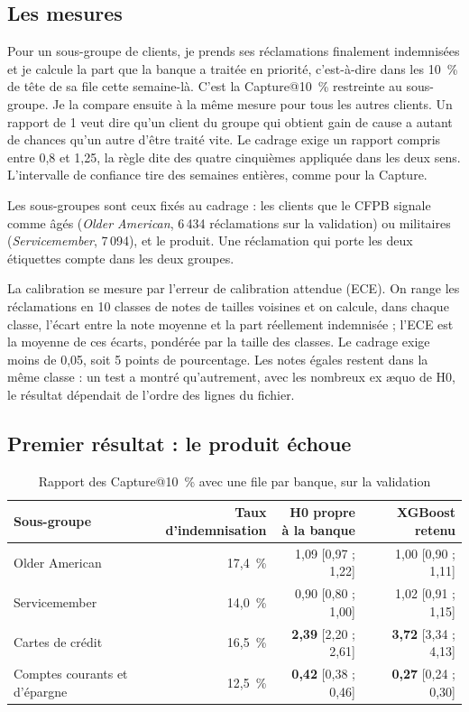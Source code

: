 \documentclass[11pt,a4paper]{article}
\begin{document}
\subsection{Les mesures}

Pour un sous-groupe de clients, je prends ses réclamations finalement indemnisées et je calcule la part que la banque a traitée en priorité, c'est-à-dire dans les 10~\% de tête de sa file cette semaine-là. C'est la Capture@10~\% restreinte au sous-groupe. Je la compare ensuite à la même mesure pour tous les autres clients. Un rapport de 1 veut dire qu'un client du groupe qui obtient gain de cause a autant de chances qu'un autre d'être traité vite. Le cadrage exige un rapport compris entre 0,8 et 1,25, la règle dite des quatre cinquièmes appliquée dans les deux sens. L'intervalle de confiance tire des semaines entières, comme pour la Capture.

Les sous-groupes sont ceux fixés au cadrage : les clients que le CFPB signale comme âgés (\emph{Older American}, 6\,434 réclamations sur la validation) ou militaires (\emph{Servicemember}, 7\,094), et le produit. Une réclamation qui porte les deux étiquettes compte dans les deux groupes.

La calibration se mesure par l'erreur de calibration attendue (ECE). On range les réclamations en 10 classes de notes de tailles voisines et on calcule, dans chaque classe, l'écart entre la note moyenne et la part réellement indemnisée ; l'ECE est la moyenne de ces écarts, pondérée par la taille des classes. Le cadrage exige moins de 0,05, soit 5 points de pourcentage. Les notes égales restent dans la même classe : un test a montré qu'autrement, avec les nombreux ex æquo de H0, le résultat dépendait de l'ordre des lignes du fichier.

\subsection{Premier résultat : le produit échoue}

\begin{table}[H]
\centering\small
\begin{tabular}{@{}l r r r@{}}
\toprule
Sous-groupe & \shortstack[r]{Taux\\d'indemnisation} & \shortstack[r]{H0 propre\\à la banque} & XGBoost retenu \\
\midrule
Older American & 17,4~\% & 1,09 [0,97 ; 1,22] & 1,00 [0,90 ; 1,11] \\
Servicemember & 14,0~\% & 0,90 [0,80 ; 1,00] & 1,02 [0,91 ; 1,15] \\
Cartes de crédit & 16,5~\% & \textbf{2,39} [2,20 ; 2,61] & \textbf{3,72} [3,34 ; 4,13] \\
Comptes courants et d'épargne & 12,5~\% & \textbf{0,42} [0,38 ; 0,46] & \textbf{0,27} [0,24 ; 0,30] \\
\bottomrule
\end{tabular}
\caption{Rapport des Capture@10~\% avec une file par banque, sur la validation}
\end{table}
\end{document}
